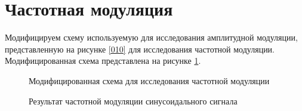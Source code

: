 \documentclass[a4paper,14pt]{extarticle}
\begin{document}
\section{Частотная модуляция}

Модифицируем схему используемую для исследования амплитудной модуляции, представленную на рисунке \ref{010} для исследования частотной модуляции. Модифицированная схема представлена на рисунке \ref{014}.

\begin{figure}[H]
\begin{minipage}[h]{0.69\linewidth}
\end{minipage}
\hfill
\begin{minipage}[h]{0.29\linewidth}
\end{minipage}
\caption{Модифицированная схема для исследования частотной модуляции}
\label{014}
\end{figure}

\begin{figure}[H]
\caption{Результат частотной модуляции синусоидального сигнала}
\label{015}
\end{figure}
\end{document}

